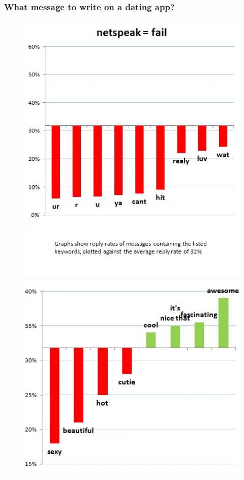 \documentclass[aspectratio=169]{beamer}
\begin{document}
\begin{frame}
    \frametitle{What message to write on a dating app?}
    \begin{figure}
        \begin{minipage}{.3\textwidth}
            \vspace{.65cm}
            \includegraphics[width = \textwidth]{cupid_1.png}
        \end{minipage}
        \begin{minipage}{.3\textwidth}
            \includegraphics[width = \textwidth]{cupid_2.png}

\end{minipage}
\end{figure}
\end{frame}
\end{document}
